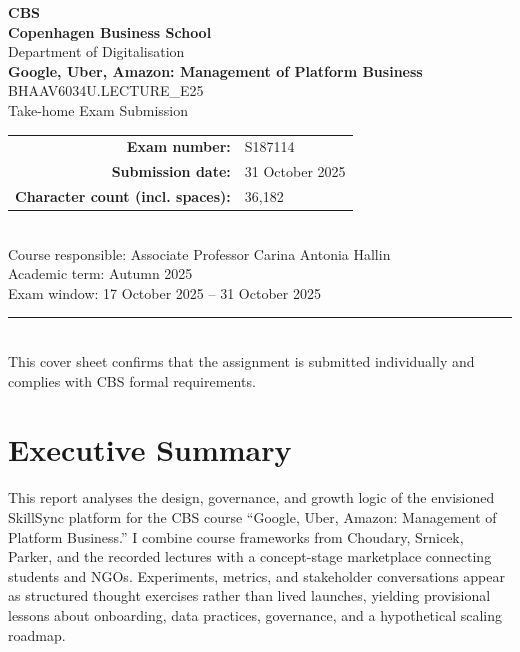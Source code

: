 \documentclass[12pt,a4paper]{article}
\newcommand{\university}{Copenhagen Business School}
\newcommand{\faculty}{Department of Digitalisation}
\newcommand{\examTitle}{Google, Uber, Amazon: Management of Platform Business}
\newcommand{\examCode}{BHAAV6034U.LECTURE\_E25}
\newcommand{\examType}{Take-home Exam Submission}
\newcommand{\studentId}{S187114}
\newcommand{\submissionDate}{31 October 2025}
\newcommand{\wordCount}{36,182}
\begin{document}
\begin{titlepage}
  \thispagestyle{empty}
  \centering
  {\Large \textcolor{gray!70}{\textbf{CBS}}}\\[1cm]
  {\Large \textbf{\university}}\\[0.5cm]
  {\large \faculty}\\[1.5cm]
  {\LARGE \textbf{\examTitle}}\\[0.5cm]
  {\large \examCode\\\examType}\\[1.5cm]
  \begin{tabular}{rl}
    \textbf{Exam number:} & \studentId \\
    \textbf{Submission date:} & \submissionDate \\
    \textbf{Character count (incl. spaces):} & \wordCount \\
  \end{tabular}\\[1.5cm]
  \vfill
  {\large Course responsible: Associate Professor Carina Antonia Hallin}\\[0.3cm]
  {\large Academic term: Autumn 2025}\\[0.3cm]
  {\large Exam window: 17 October 2025 -- 31 October 2025}\\[1.5cm]
  \rule{0.8\linewidth}{0.4pt}\\[0.5cm]
  {\small This cover sheet confirms that the assignment is submitted individually and complies with CBS formal requirements.}
\end{titlepage}

\setcounter{secnumdepth}{-1}
\makeatletter
\renewcommand{\numberline}[1]{}
\makeatother

\section*{Executive Summary}
This report analyses the design, governance, and growth logic of the envisioned SkillSync platform for the CBS course ``Google, Uber, Amazon: Management of Platform Business.'' I combine course frameworks from Choudary, Srnicek, Parker, and the recorded lectures with a concept-stage marketplace connecting students and NGOs. Experiments, metrics, and stakeholder conversations appear as structured thought exercises rather than lived launches, yielding provisional lessons about onboarding, data practices, governance, and a hypothetical scaling roadmap.
\end{document}
